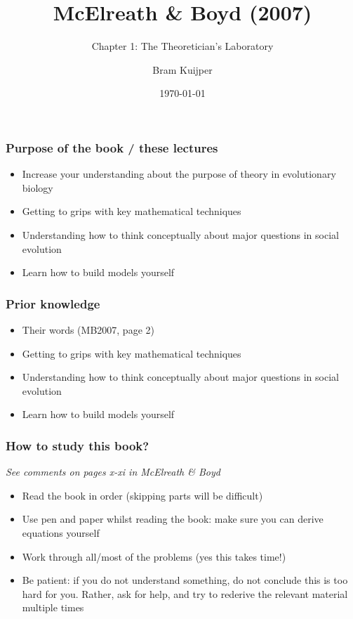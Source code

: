 \documentclass[aspectratio=169]{beamer}
\title{McElreath \& Boyd (2007)}
\subtitle{Chapter 1: The Theoretician's Laboratory}
\author{Bram Kuijper}
\institute{University of Exeter, Penryn Campus}
\date{\today}
\begin{document}
\frame{\titlepage}


\begin{frame}
\frametitle{Purpose of the book / these lectures}
\begin{itemize}
    \item Increase your understanding about the purpose of theory in evolutionary biology 
    \item Getting to grips with key mathematical techniques
    \item Understanding how to think conceptually about major questions in social evolution
    \item Learn how to build models yourself
\end{itemize}
\end{frame}


\begin{frame}
\frametitle{Prior knowledge}
\begin{itemize}
    \item Their words (MB2007, page 2)
    \item Getting to grips with key mathematical techniques
    \item Understanding how to think conceptually about major questions in social evolution
    \item Learn how to build models yourself
\end{itemize}
\end{frame}


\begin{frame}
\frametitle{How to study this book?}
    \emph{See comments on pages x-xi in McElreath \& Boyd}
\begin{itemize}
    \item Read the book in order (skipping parts will be difficult)
    \item Use pen and paper whilst reading the book: make sure you can derive equations yourself
    \item Work through all/most of the problems (yes this takes time!)
    \item Be patient: if you do not understand something, do not conclude this is too hard for you. Rather, ask for help, and try to rederive the relevant material multiple times
\end{itemize}
\end{frame}
\end{document}
